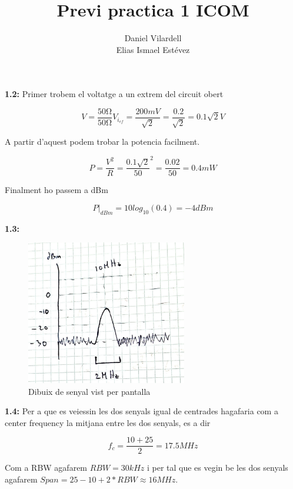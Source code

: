 \documentclass[12pt, a4papre]{article}
\author{Daniel Vilardell \\ Elias Ismael Estévez}
\title{Previ practica 1 ICOM}
\date{}
\begin{document}
	\maketitle
	\textbf{1.2:} Primer trobem el voltatge a un extrem del circuit obert
	
	\[
		V = \frac{50\si{\ohm}}{50\si{\ohm}}V_{i_{ef}} = \frac{200mV}{\sqrt{2}} = \frac{0.2}{\sqrt{2}} = 0.1\sqrt{2} V
	\]  
	
	A partir d'aquest podem trobar la potencia facilment.
	
	\[
		P = \frac{V^2}{R} = \frac{0.1\sqrt{2}}{50}^2 = \frac{0.02}{50} = 0.4 mW
	\]
	
	Finalment ho passem a dBm
	
	\[
		P|_{dBm} = 10log_10(0.4) = -4dBm
	\]
	
	\textbf{1.3:} 
	
	\begin{figure}[H]
		\begin{center}
		\includegraphics[width=70mm]{Previ_1.png}
		\caption{Dibuix de senyal vist per pantalla}
		\end{center}
	\end{figure}
	
	\textbf{1.4:} Per a que es veiessin les dos senyals igual de centrades hagafaria com a center frequency la mitjana entre les dos senyals, es a dir 
	
	\[
		f_c = \frac{10 + 25}{2} = 17.5MHz
	\]
	
	Com a RBW agafarem $RBW = 30kHz$ i per tal que es vegin be les dos senyals agafarem $Span = 25 - 10 + 2*RBW \approx 16MHz$.
	
\end{document}
